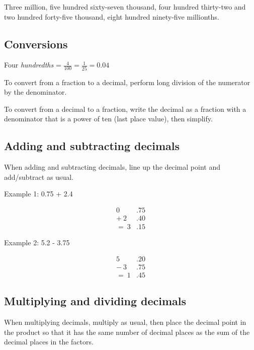 \documentclass[a4paper, 12pt]{article}
\begin{document}
Three million, five hundred sixty-seven thousand, four hundred thirty-two and two hundred forty-five thousand, eight hundred ninety-five millionths.

\subsection*{Conversions}

Four \textit{hundredths} = $\displaystyle \frac{4}{100} = \frac{1}{25} = 0.04$

To convert from a fraction to a decimal, perform long division of the numerator by the denominator.

To convert from a decimal to a fraction, write the decimal as a fraction with a denominator that is a power of ten (last place value), then simplify.

\subsection*{Adding and subtracting decimals}

When adding and subtracting decimals, line up the decimal point and add/subtract as usual.

Example 1: 0.75 + 2.4

\begin{align*}
0&.75 \\
+ \: 2&.40 \\
= \: 3&.15
\end{align*}

Example 2: 5.2 - 3.75

\begin{align*}
5&.20 \\
- \: 3&.75 \\
= \: 1&.45
\end{align*}

\subsection*{Multiplying and dividing decimals}

When multiplying decimals, multiply as usual, then place the decimal point in the product so that it has the same number of decimal places as the sum of the decimal places in the factors.
\end{document}
